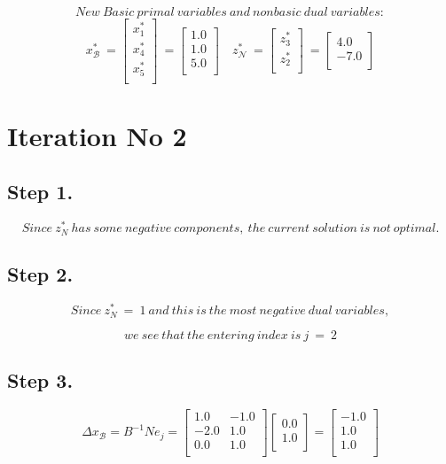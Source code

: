 \[
New\ Basic\ primal\ variables\ and\ nonbasic\ dual\ variables:
\]
\[
x_{\mathcal B}^{*}\ =\begin{bmatrix}
x_{1}^{*} \\x_{4}^{*} \\x_{5}^{*} \\
\end{bmatrix}\ =\begin{bmatrix}
1.0 \\ 1.0 \\ 5.0 \\ 
\end{bmatrix}\quad
z_{\mathcal N}^{*}\ =\begin{bmatrix}
z_{3}^{*} \\z_{2}^{*} \\
\end{bmatrix}\ =\begin{bmatrix}
4.0 \\ -7.0 \\ 
\end{bmatrix}
\]
\section*{Iteration No 2}
\subsection{Step 1.}
\[
Since\ z_\mathit{N}^*\ has\ some\ negative\ components,\ the\ current\ solution\ is\ not\ optimal.
\]
\subsection{Step 2.}
\[
Since\ z_\mathit{N}^*\ = \ 1\ and\ this\ is\ the\ most\ negative\ dual\ variables,
\]

\[
we\ see\ that\ the\ entering\ index\ is\  j\ =\ 2
\]
\subsection{Step 3.}
\[
\Delta x_{\mathcal B} = B^{-1} N e_j =
\begin{bmatrix}
1.0 & -1.0 \\ -2.0 & 1.0 \\ 0.0 & 1.0 \\ 
\end{bmatrix}
\begin{bmatrix}
0.0 \\ 1.0 \\ 
\end{bmatrix}
= \begin{bmatrix}
-1.0 \\ 1.0 \\ 1.0 \\ 
\end{bmatrix}
\]
